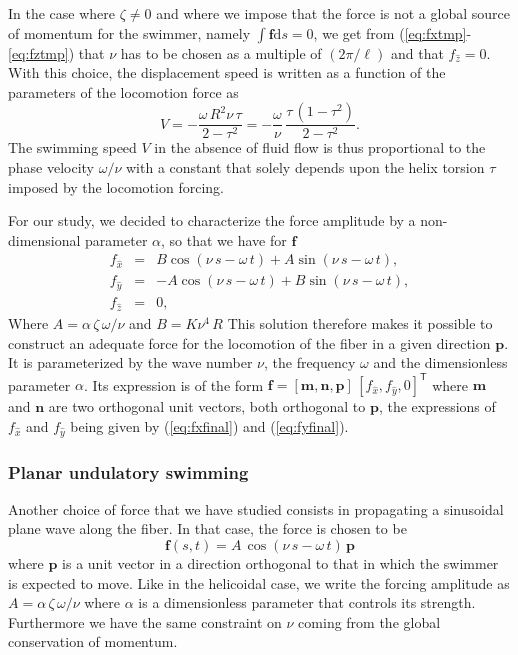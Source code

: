 \documentclass[aps,prl,preprint,groupedaddress]{revtex4-2}
\newcommand{\bF}{\bm f}
\begin{document}
In the case where $\zeta\neq0$ and where we impose that the force is not a global source of momentum for the swimmer, namely $\int\bm f \mathrm{d}s = 0$, we get from (\ref{eq:fxtmp}-\ref{eq:fztmp}) that $\nu$ has to be chosen as a multiple of $(2\pi/\ell)$ and that $f_{\hat{z}} = 0$. With this choice, the displacement speed is written as a function of the parameters of the locomotion force as
\begin{equation}
  V = -\frac{\omega\,R^2\nu\,\tau}{2-\tau^2} = -\frac{\omega}{\nu} \, \frac{\tau\,(1-\tau^2)}{2-\tau^2}.
\end{equation}
The swimming speed $V$ in the absence of fluid flow is thus proportional to the phase velocity $\omega/\nu$ with a constant that solely depends upon the helix torsion $\tau$ imposed by the locomotion forcing.

For our study, we decided to characterize the force amplitude by a non-dimensional parameter $\alpha$, so that we have for $\bF$ 
\begin{eqnarray}
  f_{\hat{x}} &=& B\cos(\nu\,s-\omega\,t) + A\sin(\nu\,s-\omega\,t), \label{eq:fxfinal}\\
  f_{\hat{y}}&=& -A\cos(\nu\,s-\omega\,t)+B\sin(\nu\,s-\omega\,t), \label{eq:fyfinal}\\
   f_{\hat{z}} &=& 0 \label{eq:fzfinal},
 \end{eqnarray}
Where $A = \alpha\,\zeta\,\omega/\nu$ and $B=K\nu^4\,R$
This solution therefore makes it possible to construct an adequate force for the locomotion of the fiber in a given direction $\bm p$. It is parameterized by the wave number $\nu$, the frequency $\omega$ and the dimensionless parameter $\alpha$. Its expression is of the form $\bm f=[\bm m,\bm n,\bm p]\, [f_{\hat{x}}, f_{\hat{y}},0]^{\mathsf{T}} $ where $\bm m$ and $\bm n$ are two orthogonal unit vectors, both orthogonal to $\bm p$, the expressions of $f_{\hat{x}}$ and $f_{\hat{y}}$ being given by (\ref{eq:fxfinal}) and (\ref{eq:fyfinal}).

\subsubsection{Planar undulatory swimming}
Another choice of force that we have studied consists in propagating a sinusoidal plane wave along the fiber. In that case, the force is chosen to be 
\begin{equation}
    \bF(s,t) = A\,\cos(\nu\,s-\omega\,t)\,\bm p
    \label{eq:sinusoidal_force}
\end{equation}
where $\bm p$ is a unit vector in a direction orthogonal to that in which the swimmer is expected to move. Like in the helicoidal case, we write the forcing amplitude as $A = \alpha\,\zeta\,\omega/\nu$ where $\alpha$ is a dimensionless parameter that controls its strength. Furthermore we have the same constraint on $\nu$ coming from the global conservation of momentum.
\end{document}
